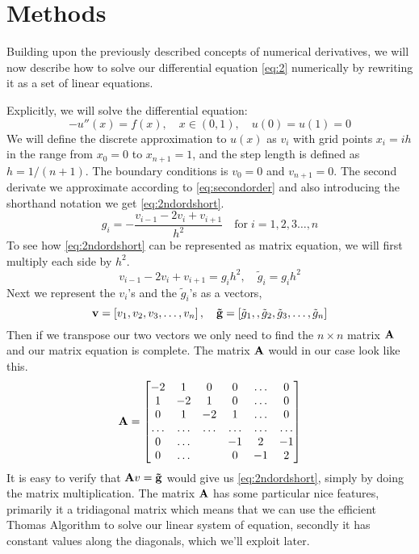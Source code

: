 \section*{Methods} 
Building upon the previously described concepts of numerical derivatives, we will now describe how to solve our differential
equation \cref{eq:2}  numerically by rewriting it as a set of linear equations.
\par
Explicitly, we will solve the differential equation:
\begin{equation*}
  -u''(x) = f(x), \quad x \in (0,1), \quad u(0)=u(1)=0 
\end{equation*} 
We will define the discrete approximation to $u(x)$ as $v_i$ with grid points
$x_i = ih$ in the range from $x_0 = 0$ to $x_{n +1} = 1$, and the step length is
defined as $h = 1/(n+1)$. The boundary conditions is $v_0 = 0$ and 
$v_{n+1} = 0$. The second derivate we approximate according to
\cref{eq:secondorder} and also introducing the shorthand notation we get \cref{eq:2ndordshort}.  
\begin{equation}\label{eq:2ndordshort}
  g_i = -\frac{v_{i-1}-2v_i + v_{i+1}}{h^2} \quad \mathrm{for} \; i = 1,2,3 \dots , n
\end{equation}  
To see how \cref{eq:2ndordshort} can be represented as matrix equation, we will
first multiply each side by $h^2$.
\begin{equation*}
  v_{i-1} -2v_{i} + v_{i+1} = g_i h^2, \quad  \tilde{g}_i = g_i h^2
\end{equation*} 
Next we represent the $v_i$'s and the $\tilde{g}_i$'s as a vectors,
\begin{equation*}
  \mathbf{v} = \left[v_1, v_2, v_3 ,\dots, v_{n}\right], \quad 
  \mathbf{\tilde{g}} = \left[\tilde{g}_1,, \tilde{g}_2, \tilde{g}_3,
  \dots, \tilde{g}_{n} \right]
\end{equation*}  
Then if we transpose our two vectors we only need to find the $n\times n$ matrix
$\mathbf{A}$ and our matrix equation is complete. The matrix $\mathbf{A}$ would in
our case look like this.
\begin{equation*}
  \mathbf{A} = 
  \begin{bmatrix}
    -2 & 1 & 0 & 0 &\dots & 0 \\
     1 & -2 & 1 & 0 & \dots & 0 \\
     0 & 1 & -2 & 1 & \dots & 0  \\
     \dots & \dots & \dots & \dots & \dots & \dots \\
     0 & \dots & & -1 & 2 & -1 \\
     0 & \dots & & 0 & -1 & 2
  \end{bmatrix}
\end{equation*}
It is easy to verify that $\mathbf{A} v = \mathbf{\tilde{g}}$ would give us 
\cref{eq:2ndordshort}, simply by doing the matrix multiplication. The matrix $\mathbf{A}$ has some
particular nice features, primarily it a tridiagonal matrix which means that we
can use the efficient Thomas Algorithm to solve our linear system of equation,
secondly it has constant values along the diagonals, which we'll exploit later.    

